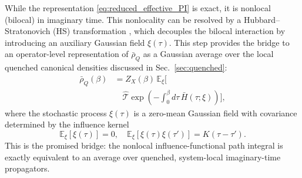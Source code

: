 While the representation \eqref{eq:reduced_effective_PI} is exact, it is nonlocal (bilocal) in imaginary time. This nonlocality can be resolved by a Hubbard--Stratonovich (HS) transformation \cite{hubbardCalculationPartitionFunctions1959a, stratonovich1957QDistro}, which decouples the bilocal interaction by introducing an auxiliary Gaussian field $\xi(\tau)$. This step provides the bridge to an operator-level representation of $\bar{\rho}_Q$ as a Gaussian average over the local quenched canonical densities discussed in Sec.~\ref{sec:quenched}:
\begin{equation}
\begin{split}
    \bar\rho_Q(\beta) 
    &= 
    Z_X(\beta)\,\mathbb E_\xi\bigg[ \\
    &\quad \hat{\mathcal{T}}\exp\!\left(-\int_0^\beta d\tau\,\bar{H}(\tau;\xi)\right) \bigg],
\end{split}
    \label{eq:bar_rho_as_quenched_average}
\end{equation}
where the stochastic process $\xi(\tau)$ is a zero-mean Gaussian field with covariance determined by the influence kernel \cite{mccaulPartitionfreeApproachOpen2017c,mccaulDrivingSpinbosonModels2018a,mccaulHowWinFriends2021b}
\begin{equation}
    \mathbb{E}_\xi[\xi(\tau)] = 0, \quad \mathbb{E}_\xi[\xi(\tau)\xi(\tau')] = K(\tau-\tau').
    \label{eq:noise_statistics}
\end{equation}
This is the promised bridge: the nonlocal influence-functional path integral is exactly equivalent to an average over quenched, system-local imaginary-time propagators.

